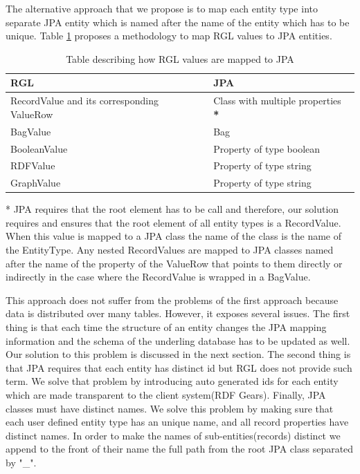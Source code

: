 The alternative approach that we propose is to map each entity type into separate JPA entity which is named after the name of the entity which has to be unique. Table \ref{tbl:rgl2gpa} proposes a methodology to map RGL values to JPA entities.

\begin{table}[h]
    \begin{tabular}{ | l | l |}
    \hline
    RGL & JPA  \\ \hline
    RecordValue and its corresponding ValueRow & Class with multiple properties \textbf{*}  \\ \hline
    BagValue & Bag  \\ \hline
    BooleanValue & Property of type boolean  \\ \hline
    RDFValue & Property of type string  \\ \hline
	GraphValue & Property of type string  \\ \hline
	
    \end{tabular}
     \caption{Table describing how RGL values are mapped to JPA}
    \label{tbl:rgl2gpa}
\end{table}

* JPA requires that the root element has to be call and therefore, our solution requires and ensures that the root element of all entity types is a RecordValue. When this value is mapped to a JPA class the name of the class is the name of the EntityType. Any nested RecordValues are mapped to JPA classes named after the name of the property of the ValueRow that points to them directly or indirectly in the case where the RecordValue is wrapped in a BagValue. 

This approach does not suffer from the problems of the first approach because data is distributed over many tables. However, it exposes several issues. The first thing is that each time the structure of an entity changes the JPA mapping information and the schema of the underling database has to be updated as well. Our solution to this problem is discussed in the next section. The second thing is that JPA requires that each entity has distinct id but RGL does not provide such term. We solve that problem by introducing auto generated ids for each entity which are made transparent to the client system(RDF Gears). Finally, JPA classes must have distinct names. We solve this problem by making sure that each user defined entity type has an unique name, and all record properties have distinct names. In order to make the names of sub-entities(records) distinct we append to the front of their name the full path from the root JPA class separated by "\_".


